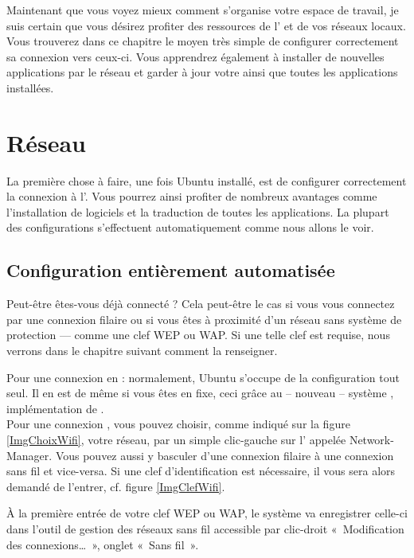  {Maintenant que vous voyez mieux}{ comment s'organise votre espace de travail, je suis certain que vous désirez profiter des ressources de l' et de vos réseaux locaux. Vous trouverez dans ce chapitre le moyen très simple de configurer correctement sa connexion vers ceux-ci. Vous apprendrez également à installer de nouvelles applications par le réseau et garder à jour votre  ainsi que toutes les applications installées.}
\section{Réseau}
\label{RefInstallReseau}
La première chose à faire, une fois Ubuntu installé, est de configurer correctement la connexion à l'. Vous pourrez ainsi profiter de nombreux avantages comme l'installation de logiciels et la traduction de toutes les applications. La plupart des configurations s'effectuent automatiquement comme nous allons le voir.
\subsection{Configuration entièrement automatisée}
\label{RefUtilisationNM}
Peut-être êtes-vous déjà connecté ? Cela peut-être le cas si vous vous connectez par une connexion filaire ou si vous êtes à proximité d'un réseau  sans système de protection --- comme une clef WEP ou WAP. Si une telle clef est requise, nous verrons dans le chapitre suivant comment la renseigner.\par
Pour une connexion  en  : normalement, Ubuntu s'occupe de la configuration tout seul. Il en est de même si vous êtes en  fixe, ceci grâce au -- nouveau -- système , implémentation de .\\
Pour une connexion , vous pouvez choisir, comme indiqué sur la figure \ref{ImgChoixWifi}, votre réseau, par un simple clic-gauche sur l' appelée Network-Manager. Vous pouvez aussi y basculer d'une connexion filaire à une connexion sans fil et vice-versa. Si une clef d'identification est nécessaire, il vous sera alors demandé de l'entrer, cf. figure \ref{ImgClefWifi}.\par
\ReseauNM
À la première entrée de votre clef WEP ou WAP, le système va enregistrer celle-ci dans l'outil de gestion des réseaux sans fil accessible par clic-droit «~Modification des connexions\ldots{}~», onglet «~Sans fil~».\par

